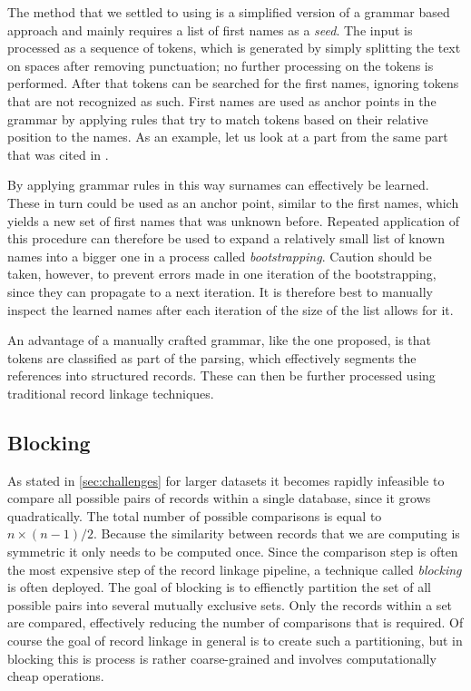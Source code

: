 The method that we settled to using is a simplified version of a grammar based approach and mainly requires a list of first names as a \emph{seed}.
The input is processed as a sequence of tokens, which is generated by simply splitting the text on spaces after removing punctuation; no further processing on the tokens is performed.
After that tokens can be searched for the first names, ignoring tokens that are not recognized as such.
First names are used as anchor points in the grammar by applying rules that try to match tokens based on their relative position to the names.
As an example, let us look at a part from the same part that was cited in .

By applying grammar rules in this way surnames can effectively be learned.
These in turn could be used as an anchor point, similar to the first names, which yields a new set of first names that was unknown before.
Repeated application of this procedure can therefore be used to expand a relatively small list of known names into a bigger one in a process called \emph{bootstrapping}.
Caution should be taken, however, to prevent errors made in one iteration of the bootstrapping, since they can propagate to a next iteration.
It is therefore best to manually inspect the learned names after each iteration of the size of the list allows for it.

An advantage of a manually crafted grammar, like the one proposed, is that tokens are classified as part of the parsing, which effectively segments the references into structured records.
These can then be further processed using traditional record linkage techniques.




\subsection{Blocking}
\label{sec:blocking}

As stated in \cref{sec:challenges} for larger datasets it becomes rapidly infeasible to compare all possible pairs of records within a single database, since it grows quadratically.
The total number of possible comparisons is equal to $n\times(n-1)/2$.
Because the similarity between records that we are computing is symmetric it only needs to be computed once.
Since the comparison step is often the most expensive step of the record linkage pipeline, a technique called \emph{blocking} is often deployed.
The goal of blocking is to effienctly partition the set of all possible pairs into several mutually exclusive sets.
Only the records within a set are compared, effectively reducing the number of comparisons that is required.
Of course the goal of record linkage in general is to create such a partitioning, but in blocking this is process is rather coarse-grained and involves computationally cheap operations.

